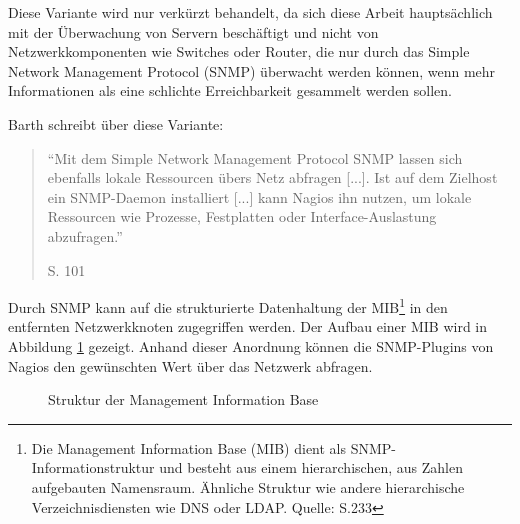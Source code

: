 Diese Variante wird nur verkürzt behandelt, da sich diese Arbeit hauptsächlich mit der Überwachung von Servern beschäftigt und nicht von Netzwerkkomponenten wie Switches oder Router, die nur durch das Simple Network Management Protocol (\gls{SNMP}) überwacht werden können, wenn mehr Informationen als eine schlichte Erreichbarkeit gesammelt werden sollen.

Barth schreibt über diese Variante:
\begin{quote}"`Mit dem Simple Network Management Protocol \gls{SNMP} lassen sich ebenfalls lokale Ressourcen übers Netz abfragen [...]. Ist auf dem Zielhost ein \gls{SNMP}-Daemon installiert [...] kann Nagios ihn nutzen, um lokale Ressourcen wie Prozesse, Festplatten oder Interface-Auslastung abzufragen."' \begin{flushright}\cite{Barth08} S. 101\end{flushright}\end{quote} 

Durch \gls{SNMP} kann auf die strukturierte Datenhaltung der \gls{MIB}\footnote{Die Management Information Base (\gls{MIB}) dient als \gls{SNMP}-Informationstruktur und besteht aus einem hierarchischen, aus Zahlen aufgebauten Namensraum. Ähnliche Struktur wie andere hierarchische Verzeichnisdiensten wie \gls{DNS} oder \gls{LDAP}. Quelle: \cite{Barth08} S.233} in den entfernten Netzwerkknoten zugegriffen werden.
Der Aufbau einer \gls{MIB} wird in Abbildung \ref{munin-mib} gezeigt.
Anhand dieser Anordnung können die \gls{SNMP}-Plugins von Nagios den gewünschten Wert über das Netzwerk abfragen.

\begin{figure}[ht]
	\centering
		\caption[Struktur der Management Information Base]{Struktur der Management Information Base\protect\footnotemark}
		\label{munin-mib}
\end{figure}

